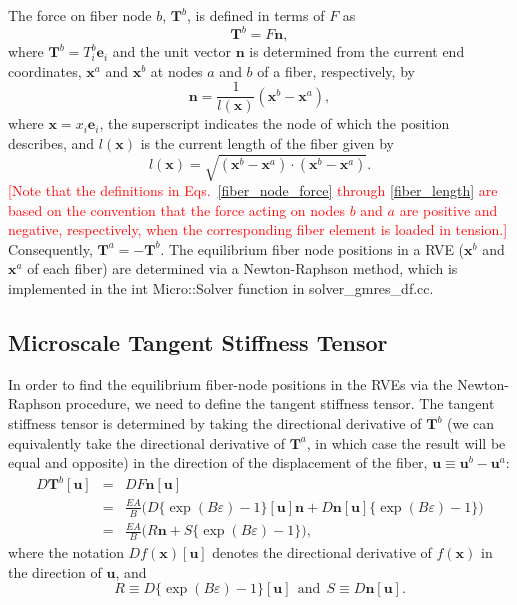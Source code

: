 \documentclass[12pt,aps,pre]{revtex4}
\newcommand{\red}[1]{\textcolor{red}{[#1]}}
\begin{document}
The force on fiber node $b$, $\textbf{T}^b$, is defined in terms of $F$ as
%
\begin{equation}
\textbf{T}^b = F \textbf{n},
\label{fiber_node_force}
\end{equation}
%
where $\textbf{T}^b = T^b_i \textbf{e}_i$ and the unit vector $\textbf{n}$ is determined from the current end coordinates, $\textbf{x}^a$ and $\textbf{x}^b$ at nodes $a$ and $b$ of a fiber, respectively, by
%
\begin{equation}
\textbf{n} = \frac{1}{l(\textbf{x})}(\textbf{x}^b - \textbf{x}^a),
\end{equation}
%
where $\textbf{x} = x_i \textbf{e}_i$, the superscript indicates the node of which the position describes, and $l(\textbf{x})$ is the current length of the fiber given by
%
\begin{equation}
l(\textbf{x}) = \sqrt{(\textbf{x}^b - \textbf{x}^a) \cdot (\textbf{x}^b - \textbf{x}^a)}.
\label{fiber_length}
\end{equation}
%
\red{Note that the definitions in Eqs.\ \eqref{fiber_node_force} through \eqref{fiber_length} are based on the convention that the force acting on nodes $b$ and $a$ are positive and negative, respectively, when the corresponding fiber element is loaded in tension.}  Consequently, $\textbf{T}^a = - \textbf{T}^b$. The equilibrium fiber node positions in a RVE ($\textbf{x}^b$ and $\textbf{x}^a$ of each fiber) are determined via a Newton-Raphson method, which is implemented in the int Micro::Solver function in solver\_gmres\_df.cc. 

\subsection{Microscale Tangent Stiffness Tensor}
\label{subsec:tangent_stiffness_tensor}

In order to find the equilibrium fiber-node positions in the RVEs via the Newton-Raphson procedure, we need to define the tangent stiffness tensor. The tangent stiffness tensor is determined by taking the directional derivative of $\textbf{T}^b$ (we can equivalently take the directional derivative of $\textbf{T}^a$, in which case the result will be equal and opposite) in the direction of the displacement of the fiber, $\textbf{u} \equiv \textbf{u}^b - \textbf{u}^a$:
%
\begin{eqnarray}
D\textbf{T}^b [\textbf{u}] &=& D F \textbf{n} [\textbf{u}] \nonumber\\
&=& \frac{E A}{B} \bigg(D \{ \exp(B \varepsilon) - 1\} [\textbf{u}] \textbf{n}+ D \textbf{n} [\textbf{u}] \{ \exp(B \varepsilon) - 1\} \bigg) \nonumber\\
&=& \frac{E A}{B} \bigg( R\textbf{n} + S\{\exp(B \varepsilon) - 1\} \bigg),
\label{DT_i}
\end{eqnarray}
%
where the notation $D f(\textbf{x}) [\textbf{u}]$ denotes the directional derivative of $f(\textbf{x})$ in the direction of $\textbf{u}$, and
% 
\begin{equation}
R \equiv D \{ \exp(B \varepsilon) - 1\} [\textbf{u}] \ \ \text{and} \ \
S \equiv D \textbf{n} [\textbf{u}].
\end{equation}
%
\end{document}
